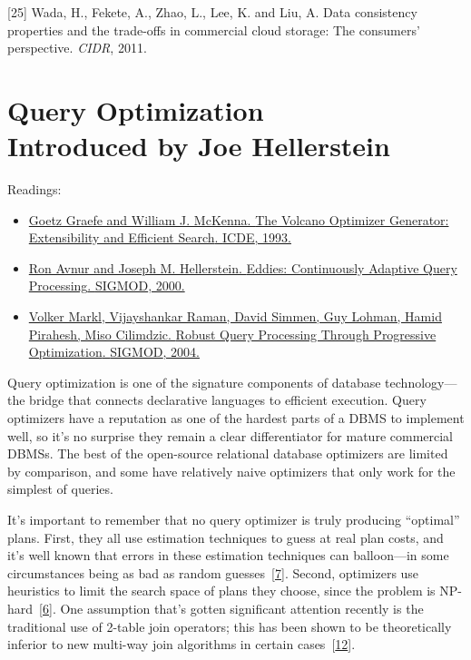\documentclass[b5paper,11pt,twoside,openright]{book}
\newcommand\Chapter[3]{
  \hypertarget{#1}{
    \chapter[#2]{#2\\{\Large #3}}\label{#1}
  }
}
\begin{document}
\leavevmode\hypertarget{ref-wada}{}%
{[}25{]} Wada, H., Fekete, A., Zhao, L., Lee, K. and Liu, A. Data
consistency properties and the trade-offs in commercial cloud storage:
The consumers' perspective. \emph{CIDR}, 2011.


\Chapter{ch7-queryoptimization}{%
Query Optimization
}{%
Introduced by Joe Hellerstein
}

\begin{framed}
Readings:
\begin{itemize}
\item
\href{https://scholar.google.com/scholar?cluster=2304531151126477511}{Goetz
  Graefe and William J. McKenna. {The Volcano Optimizer Generator:
    Extensibility and Efficient Search}. {ICDE}, 1993.}
\item
\href{https://scholar.google.com/scholar?cluster=13049208738754012194}{Ron
  Avnur and Joseph M. Hellerstein. {Eddies: Continuously Adaptive Query
    Processing}. {SIGMOD}, 2000.}
\item
\href{https://scholar.google.com/scholar?cluster=4929312332613352080}{Volker
  Markl, Vijayshankar Raman, David Simmen, Guy Lohman, Hamid Pirahesh,
  Miso Cilimdzic. {Robust Query Processing Through Progressive
    Optimization}. {SIGMOD}, 2004.}
\end{itemize}
\end{framed}

Query optimization is one of the signature components of database
technology---the bridge that connects declarative languages to efficient
execution. Query optimizers have a reputation as one of the hardest
parts of a DBMS to implement well, so it's no surprise they remain a
clear differentiator for mature commercial DBMSs. The best of the
open-source relational database optimizers are limited by comparison,
and some have relatively naive optimizers that only work for the
simplest of queries.

It's important to remember that no query optimizer is truly producing
``optimal'' plans. First, they all use estimation techniques to guess at
real plan costs, and it's well known that errors in these estimation
techniques can balloon---in some circumstances being as bad as random
guesses~{{[}\protect\hyperlink{ref-ic91}{7}{]}}. Second, optimizers use
heuristics to limit the search space of plans they choose, since the
problem is
NP-hard~{{[}\protect\hyperlink{ref-ibaraki1984optimal}{6}{]}}. One
assumption that's gotten significant attention recently is the
traditional use of 2-table join operators; this has been shown to be
theoretically inferior to new multi-way join algorithms in certain
cases~{{[}\protect\hyperlink{ref-ngo2012worst}{12}{]}}.
\end{document}
